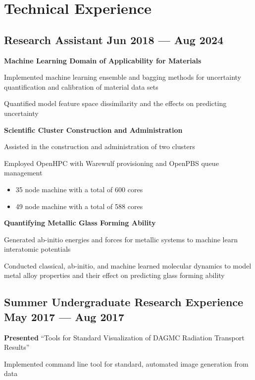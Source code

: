 \section{Technical Experience}

\subsection{{Research Assistant \hfill Jun 2018 --- Aug 2024}}
\begin{zitemize}
\item[] \textbf{Machine Learning Domain of Applicability for Materials}
    \begin{zitemize}
    \item Implemented machine learning ensemble and bagging methods for uncertainty quantification and calibration of material data sets
    \item Quantified model feature space dissimilarity and the effects on predicting uncertainty
    \end{zitemize}
\item[] \textbf{Scientific Cluster Construction and Administration}
    \begin{zitemize}
    \item Assisted in the construction and administration of two clusters
    \item Employed OpenHPC with Warewulf provisioning and OpenPBS queue management
    \begin{itemize}
        \item 35 node machine with a total of 600 cores
        \item 49 node machine with a total of 588 cores
    \end{itemize}
    \end{zitemize}
\item[] \textbf{Quantifying Metallic Glass Forming Ability}
    \begin{zitemize}
    \item Generated ab-initio energies and forces for metallic systems to machine learn interatomic potentials
    \item Conducted classical, ab-initio, and machine learned molecular dynamics to model metal alloy properties and their effect on predicting glass forming ability
    \end{zitemize}
\end{zitemize}

\subsection{{Summer Undergraduate Research Experience \hfill May 2017 --- Aug 2017}}
\begin{zitemize}
\item \textbf{Presented} ``Tools for Standard Visualization of DAGMC Radiation Transport Results''
\item Implemented command line tool for standard, automated image generation from data
\end{zitemize}

